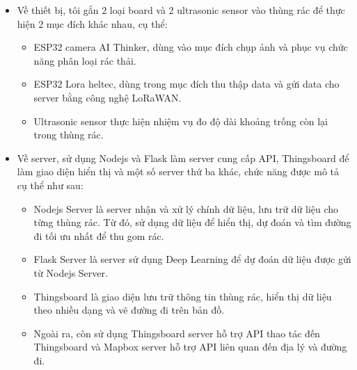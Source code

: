 \begin{itemize}
    \item Về thiết bị, tôi gắn 2 loại board và 2 ultrasonic sensor vào thùng rác để thực hiện 2 mục đích khác nhau, cụ thể:
        \begin{itemize}
            \item ESP32 camera AI Thinker, dùng vào mục đích chụp ảnh và phục vụ chức năng phân loại rác thải.
            \item  ESP32 Lora heltec, dùng trong mục đích thu thập data và gửi data cho server bằng công nghệ LoRaWAN.
            \item Ultrasonic sensor thực hiện nhiệm vụ đo độ dài khoảng trống còn lại trong thùng rác.
        \end{itemize}

    \item Về server, sử dụng Nodejs và Flask làm server cung cấp API, Thingsboard để làm giao diện hiển thị và một số server thứ ba khác, chức năng được mô tả cụ thể như sau:
        \begin{itemize}
            \item Nodejs Server là server nhận và xử lý chính dữ liệu, lưu trữ dữ liệu cho từng thùng rác. Từ đó, sử dụng dữ liệu để hiển thị, dự đoán và tìm đường đi tối ưu nhất để thu gom rác.
            \item Flask Server là server sử dụng Deep Learning để dự đoán dữ liệu được gửi từ Nodejs Server.
            \item Thingsboard là giao diện lưu trữ thông tin thùng rác, hiển thị dữ liệu theo nhiều dạng và vẽ đường đi trên bản đồ.
            \item Ngoài ra, còn sử dụng Thingsboard server hỗ trợ API thao tác đến Thingsboard và Mapbox server hỗ trợ API liên quan đến địa lý và đường đi.
        \end{itemize}
   

\end{itemize}


